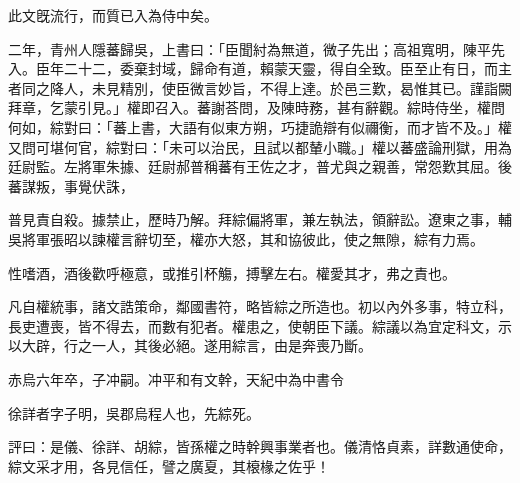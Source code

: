 \begin{pinyinscope}
 
 
 
 此文旣流行，而質已入為侍中矣。
 
 
 
 
 二年，青州人隱蕃歸吳，上書曰：「臣聞紂為無道，微子先出；高祖寬明，陳平先入。臣年二十二，委棄封域，歸命有道，賴蒙天靈，得自全致。臣至止有日，而主者同之降人，未見精別，使臣微言妙旨，不得上達。於邑三歎，曷惟其已。謹詣闕拜章，乞蒙引見。」權即召入。蕃謝荅問，及陳時務，甚有辭觀。綜時侍坐，權問何如，綜對曰：「蕃上書，大語有似東方朔，巧捷詭辯有似禰衡，而才皆不及。」權又問可堪何官，綜對曰：「未可以治民，且試以都輦小職。」權以蕃盛論刑獄，用為廷尉監。左將軍朱據、廷尉郝普稱蕃有王佐之才，普尤與之親善，常怨歎其屈。後蕃謀叛，事覺伏誅，
 
 
 普見責自殺。據禁止，歷時乃解。拜綜偏將軍，兼左執法，領辭訟。遼東之事，輔吳將軍張昭以諫權言辭切至，權亦大怒，其和協彼此，使之無隙，綜有力焉。
 
 
 
 
 性嗜酒，酒後歡呼極意，或推引杯觴，搏擊左右。權愛其才，弗之責也。
 
 
 
 
 凡自權統事，諸文誥策命，鄰國書符，略皆綜之所造也。初以內外多事，特立科，長吏遭喪，皆不得去，而數有犯者。權患之，使朝臣下議。綜議以為宜定科文，示以大辟，行之一人，其後必絕。遂用綜言，由是奔喪乃斷。
 
 
赤烏六年卒，子冲嗣。冲平和有文幹，天紀中為中書令
 
 
 
 
 徐詳者字子明，吳郡烏程人也，先綜死。
 
 
 
 
 評曰：是儀、徐詳、胡綜，皆孫權之時幹興事業者也。儀清恪貞素，詳數通使命，綜文采才用，各見信任，譬之廣夏，其榱椽之佐乎！
 
 
\end{pinyinscope}